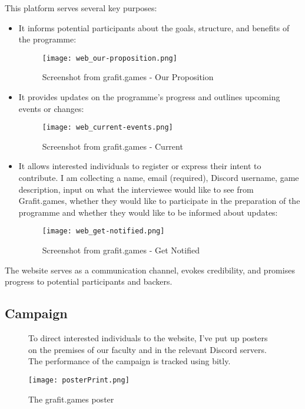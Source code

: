This platform serves several key purposes:
\begin{itemize}
    \item It informs potential participants about the goals, structure, and benefits of the programme:
    \begin{figure}[H]
        \texttt{[image: web\_our-proposition.png]}
        \caption{Screenshot from grafit.games - Our Proposition}
        \label{fig:web_our-proposition}
    \end{figure}
    \item It provides updates on the programme’s progress and outlines upcoming events or changes:
    \begin{figure}[H]
        \texttt{[image: web\_current-events.png]}
        \caption{Screenshot from grafit.games - Current}
        \label{fig:web_current-events}
    \end{figure}
    \item It allows interested individuals to register or express their intent to contribute. I am collecting a name, email (required), Discord username, game description, input on what the interviewee would like to see from Grafit.games, whether they would like to participate in the preparation of the programme and whether they would like to be informed about updates:
    \begin{figure}[H]    
        \texttt{[image: web\_get-notified.png]}
        \caption{Screenshot from grafit.games - Get Notified}
        \label{fig:web_get-notified}
    \end{figure}
\end{itemize}

The website serves as a communication channel, evokes credibility, and promises progress to potential participants and backers.
        
\subsection{Campaign}
\begin{figure}[H]
    To direct interested individuals to the website, I’ve put up posters on the premises of our faculty and in the relevant Discord servers. The performance of the campaign is tracked using bitly.
    
    \vspace{1em}
    \texttt{[image: posterPrint.png]}
    \caption{The grafit.games poster}
    \label{fig:poster}
\end{figure}

